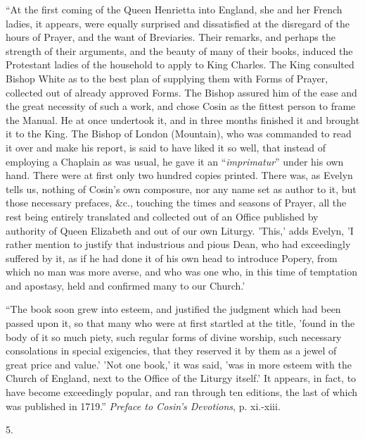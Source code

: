 ``At
the first coming of the Queen Henrietta into England, she and her
French ladies, it appears, were equally surprised and dissatisfied at
the disregard of the hours of Prayer, and the want of Breviaries.
Their remarks, and perhaps the strength of their arguments, and the
beauty of many of their books, induced the Protestant ladies of the
household to apply to King Charles. The King consulted Bishop White as
to the best plan of supplying them with Forms of Prayer, collected out
of already approved Forms. The Bishop assured him of the ease and the
great necessity of such a work, and chose Cosin as the fittest person
to frame the Manual. He at once undertook it, and in three months
finished it and brought it to the King. The Bishop of London
(Mountain), who was commanded to read it over and make his report, is
said to have liked it so well, that instead of employing a Chaplain as
was usual, he gave it an ``\emph{imprimatur}'' under his own hand. There
were at first only two hundred copies printed. There was, as Evelyn
tells us, nothing of Cosin's
own composure, nor any name set as author to it, but those necessary
prefaces, \&c., touching the times and seasons of Prayer, all the
rest being entirely translated and collected out of an Office
published by authority of Queen Elizabeth and out of our own Liturgy.
'This,' adds Evelyn, 'I rather mention to justify that industrious and
pious Dean, who had exceedingly suffered by it, as if he had done it
of his own head to introduce Popery, from which no man was more
averse, and who was one who, in this time of temptation and apostasy,
held and confirmed many to our Church.'

``The
book soon grew into esteem, and justified the judgment which had been
passed upon it, so that many who were at first startled at the title,
'found in the body of it so much piety, such regular forms of divine
worship, such necessary consolations in special exigencies, that they
reserved it by them as a jewel of great price and value.' 'Not one
book,' it was said, 'was in more esteem with the Church of England,
next to the Office of the Liturgy itself.' It appears, in fact, to
have become exceedingly popular, and ran through ten editions, the
last of which was published in 1719.'' \emph{Preface to Cosin's Devotions},
p. xi.-xiii.

5.

